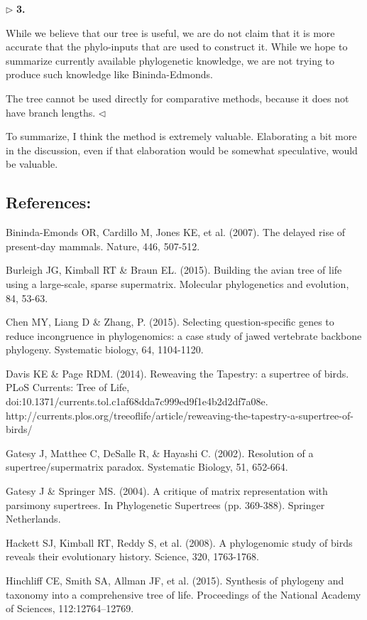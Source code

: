 \documentclass{article}
\newenvironment{reply}{$\triangleright$\bf}{$\triangleleft$}
\begin{document}
\begin{reply}
3.

While we believe that our tree is useful, we are do not claim that it is more accurate that the phylo-inputs that are used to construct it.  While we hope to summarize currently available phylogenetic knowledge, we are not trying to produce such knowledge like Bininda-Edmonds.

The tree cannot be used directly for comparative methods, because it does not have branch lengths.
\end{reply}

To summarize, I think the method is extremely valuable. Elaborating a bit more in the discussion, even if that elaboration would be somewhat speculative, would be valuable.


\subsection*{References:}

Bininda-Emonds OR, Cardillo M, Jones KE, et al. (2007). The delayed rise of present-day mammals. Nature, 446, 507-512.

Burleigh JG, Kimball RT \& Braun EL. (2015). Building the avian tree of life using a large-scale, sparse supermatrix. Molecular phylogenetics and evolution, 84, 53-63.

Chen MY, Liang D \& Zhang, P. (2015). Selecting question-specific genes to reduce incongruence in phylogenomics: a case study of jawed vertebrate backbone phylogeny. Systematic biology, 64, 1104-1120.

Davis KE \& Page RDM. (2014). Reweaving the Tapestry: a supertree of birds. PLoS Currents: Tree of Life, doi:10.1371/currents.tol.c1af68dda7c999ed9f1e4b2d2df7a08e. http://currents.plos.org/treeoflife/article/reweaving-the-tapestry-a-supertree-of-birds/

Gatesy J, Matthee C, DeSalle R, \& Hayashi C. (2002). Resolution of a supertree/supermatrix paradox. Systematic Biology, 51, 652-664.

Gatesy J \& Springer MS. (2004). A critique of matrix representation with parsimony supertrees. In Phylogenetic Supertrees (pp. 369-388). Springer Netherlands.

Hackett SJ, Kimball RT, Reddy S, et al. (2008). A phylogenomic study of birds reveals their evolutionary history. Science, 320, 1763-1768.

Hinchliff CE, Smith SA, Allman JF, et al. (2015). Synthesis of phylogeny and taxonomy into a comprehensive tree of life. Proceedings of the National Academy of Sciences, 112:12764–12769.
\end{document}
